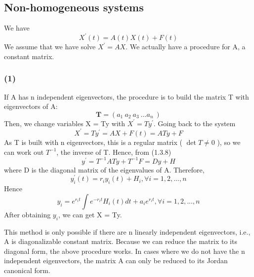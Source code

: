 \documentclass[a4paper,12pt]{report}
\numberwithin{equation}{section}
\begin{document}
\subsection{Non-homogeneous systems}
We have 
\begin{equation}
X^\prime(t)=A(t)X(t)+F(t)
\end{equation}
We assume that we have solve $X^\prime=AX$. We actually have a procedure for A, a constant matrix. \\
\subsubsection*{(1)} If A has  n independent eigenvectors, the procedure is to build the matrix T with eigenvectors of A:
\begin{equation}
\textbf{T} = (a_{1} \ a_{2} \ a_{3} \ ... a_{n}\ )
\end{equation}
Then, we change variables X = Ty with $X^\prime = Ty^{\prime}$. Going back to the system 
\begin{equation}
X^{\prime} = T y^{\prime} = AX + F(t) = ATy+F
\end{equation}
As T is built with n eigenvectors, this is a regular matrix ( $\det T \neq 0$ ), so we can work out $T^{-1}$, the inverse of T. Hence, from (1.3.8)
\begin{equation}
y^{\prime} = T^{-1}ATy + T^{-1}F = Dy + H
\end{equation}
where D is the diagonal matrix of the eigenvalues of A. Therefore,
\begin{equation}
y^{\prime}_{i}(t)= r_{i} y_{i} (t) + H_{i}, \forall i = 1,2,...,n
\end{equation}
Hence
\begin{equation}
y_{i} = e^{r_{i}t} \int e^{-r_{i}t} H_{i} (t) dt + a_{i} e^{r_{i}t}, \forall i = 1,2,...,n
\end{equation}
After obtaining $ y _{i} $, we can get X = Ty.

This method is only possible if there are n linearly independent eigenvectors, i.e., A is diagonalizable constant matrix. Because we can reduce the matrix to its diagonal form, the above procedure works. In cases where we do not have the n independent eigenvectors, the matrix A can only be reduced to its Jordan canonical form.
\end{document}
